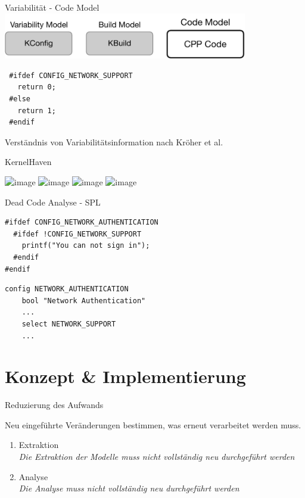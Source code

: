 \documentclass[aspectratio=43, noserifmath]{beamer}
\begin{document}
\begin{frame}[containsverbatim]{Variabilit\"at - Code Model}
\includegraphics[width=0.8\textwidth]{image/linux-build-system-3.pdf}
\begin{verbatim}
 #ifdef CONFIG_NETWORK_SUPPORT
   return 0;
 #else 
   return 1;
 #endif
\end{verbatim}

Verst\"andnis von Variabilit\"atsinformation nach Kr\"oher et al. \cite{ComAn-splc}
\end{frame}





\begin{frame}{KernelHaven}
    \begin{center}
        \includegraphics<1>[width=.85\linewidth]{image/kernelhaven-pipeline-0.png}
        \includegraphics<2>[width=.85\linewidth]{image/kernelhaven-pipeline-1.png}
        \includegraphics<3>[width=.85\linewidth]{image/kernelhaven-pipeline-2.png}
        \includegraphics<4>[width=.85\linewidth]{image/kernelhaven-pipeline-3.png}
    \end{center}
    \cite{KroeherEl-SharkawySchmid18}
\end{frame}

\begin{frame}[containsverbatim]{Dead Code Analyse - SPL}

\begin{verbatim}
#ifdef CONFIG_NETWORK_AUTHENTICATION
  #ifdef !CONFIG_NETWORK_SUPPORT
    printf("You can not sign in");
  #endif
#endif
\end{verbatim}
\begin{verbatim}
config NETWORK_AUTHENTICATION
	bool "Network Authentication"
	...
	select NETWORK_SUPPORT
	...
\end{verbatim}
\end{frame}

\section{Konzept \& Implementierung}

\begin{frame}{Reduzierung des Aufwands}

Neu eingef\"uhrte Ver\"anderungen bestimmen, was erneut verarbeitet werden muss.
\pause
\begin{enumerate}
	\item Extraktion \\
	\emph{Die Extraktion der Modelle muss nicht vollst\"andig neu durchgef\"uhrt werden}
	\pause
	\item Analyse \\
	\emph{Die Analyse muss nicht vollst\"andig neu durchgef\"uhrt werden}
\end{enumerate}
\end{frame}
\end{document}

